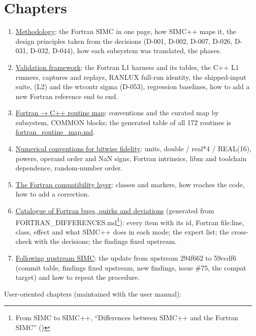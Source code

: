 \section*{\texorpdfstring{Chapters}{Chapters}}\label{translation_report-index:chapters}
\begin{enumerate}
\item \hyperref[translation_report-01u5fmethodology]{Methodology}: the Fortran SIMC in one page, how SIMC++ maps it, the design principles taken from
the decisions (D-001, D-002, D-007, D-026, D-031, D-032, D-044), how each subsystem was translated, the phases.
\item \hyperref[translation_report-02u5fvalidation]{Validation framework}: the Fortran L1 harness and its tables, the C++ L1 runners, captures and
replays, RANLUX full-run identity, the shipped-input suite,  (L2) and the wtcontr sigma (D-053),
regression baselines, how to add a new Fortran reference end to end.
\item \hyperref[translation_report-03u5froutineu5fmap]{Fortran → C++ routine map}: conventions and the curated map by subsystem, COMMON blocks; the
generated table of all 172 routines is \hyperref[translation_report-fortranu5froutineu5fmap]{fortran\_\allowbreak{}routine\_\allowbreak{}map.\allowbreak{}md}.
\item \hyperref[translation_report-04u5fnumerics]{Numerical conventions for bitwise fidelity}: units, double / real*4 / REAL(16), powers, operand
order and NaN signs, Fortran intrinsics, libm and toolchain dependence, random-number order.
\item \hyperref[translation_report-05u5fcompat]{The Fortran compatibility layer}: classes and markers, how  reaches the code, how to
add a correction.
\item \hyperref[translation_report-06u5fcatalogue]{Catalogue of Fortran bugs, quirks and deviations} (generated from
FORTRAN\_\allowbreak{}DIFFERENCES.md\footnote{From SIMC to SIMC++, ``Differences between SIMC++ and the Fortran SIMC'' ()}): every item with its id, Fortran file:line, class, effect and
what SIMC++ does in each mode; the expert list; the cross-check with the decisions; the findings fixed upstream.
\item \hyperref[translation_report-07u5ffollowingu5fupstream]{Following upstream SIMC}: the update from upstream 294f662 to 59ccdf6 (commit table,
findings fixed upstream, new findings, issue \#75, the compat target) and how to repeat the procedure.
\end{enumerate}
User-oriented chapters (maintained with the user manual):

